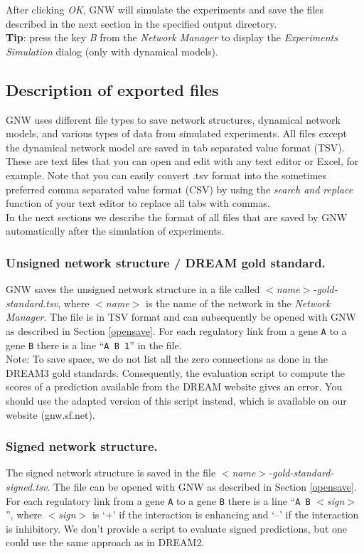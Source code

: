 \documentclass{llncs}
\begin{document}
After clicking \emph{OK}, GNW will simulate the experiments and save the files described in the next section in the specified output directory.\\

\textbf{Tip}: press the key \emph{B} from the \emph{Network Manager} to display the \emph{Experiments Simulation} dialog (only with dynamical models).

\subsection{Description of exported files}

GNW uses different file types to save network structures, dynamical network models, and various types of data from simulated experiments. All files except the dynamical network model are saved in tab separated value format (TSV). These are text files that you can open and edit with any text editor or Excel, for example. Note that you can easily convert .tsv format into the sometimes preferred comma separated value format (CSV) by using the \emph{search and replace} function of your text editor to replace all tabs with commas.\\

In the next sections we describe the format of all files that are saved by GNW automatically after the simulation of experiments.

\subsubsection{Unsigned network structure / DREAM gold standard.}
GNW saves the unsigned network structure in a file called \emph{ $<$name$>$-gold-standard.tsv}, where \emph{ $<$name$>$} is the name of the network in the \emph{Network Manager}. The file is in TSV format and can subsequently be opened with GNW as described in Section \ref{opensave}. For each regulatory link from a gene \texttt{A} to a gene \texttt{B} there is a line ``\texttt{A   B   1}'' in the file.\\

Note: To save space, we do not list all the zero connections as done in the DREAM3 gold standards. Consequently, the evaluation script to compute the scores of a prediction available from the DREAM website gives an error. You should use the adapted version of this script instead, which is available on our website (gnw.sf.net).

\subsubsection{Signed network structure.}
The signed network structure is saved in the file \emph{ $<$name$>$-gold-standard-signed.tsv}. The file can be opened with GNW as described in Section \ref{opensave}. For each regulatory link from a gene \texttt{A} to a gene \texttt{B} there is a line ``\texttt{A B} \emph{$<$sign$>$}'', where \emph{$<$sign$>$} is `+' if the interaction is enhancing and `--' if the interaction is inhibitory. We don't provide a script to evaluate signed predictions, but one could use the same approach as in DREAM2.
\end{document}

